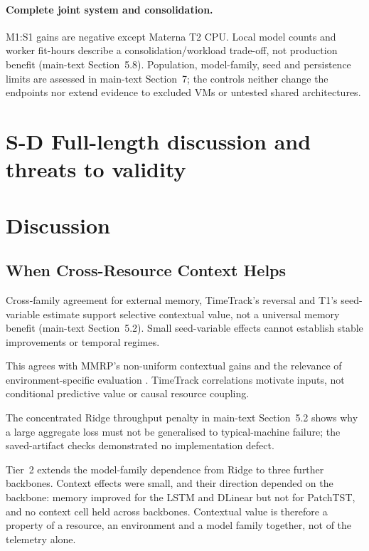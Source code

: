 \documentclass[a4paper,11pt]{article}
\begin{document}
\paragraph{Complete joint system and consolidation.}
M1:S1 gains are negative except Materna T2 CPU. Local model counts and worker
fit-hours describe a consolidation/workload trade-off, not production benefit
(main-text Section~5.8). Population, model-family, seed and
persistence limits are assessed in main-text Section~7; the controls
neither change the endpoints nor extend evidence to excluded VMs or untested
shared architectures.

\clearpage
\section*{S-D Full-length discussion and threats to validity}
\section*{Discussion}


\subsection*{When Cross-Resource Context Helps}


Cross-family agreement for external memory, TimeTrack's reversal and T1's
seed-variable estimate support selective contextual value, not a universal
memory benefit (main-text Section~5.2). Small seed-variable effects
cannot establish stable improvements or temporal regimes.

This agrees with MMRP's non-uniform contextual gains \citep{Tripathi2025MMRP}
and the relevance of environment-specific evaluation
\citep{Rossi2025CloudUncertainty}. TimeTrack correlations
\citep{Meliani2025TimeTrack} motivate inputs, not conditional predictive value
or causal resource coupling.

The concentrated Ridge throughput penalty in main-text Section~5.2
shows why a large aggregate loss must not be generalised to typical-machine
failure; the saved-artifact checks demonstrated no implementation defect.

Tier~2 extends the model-family dependence from Ridge to three further
backbones. Context effects were small, and their direction depended on the
backbone: memory improved for the LSTM and DLinear but not for PatchTST, and
no context cell held across backbones. Contextual value is therefore a
property of a resource, an environment and a model family together, not of
the telemetry alone.
\end{document}
